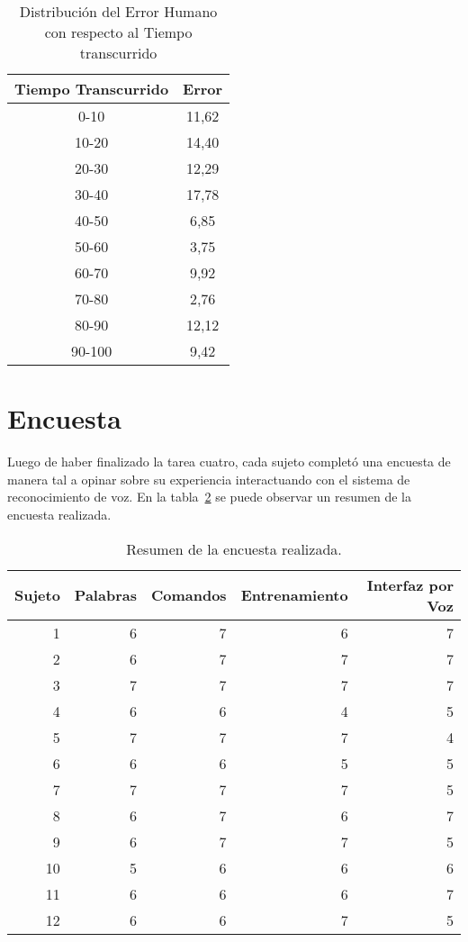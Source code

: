\begin{table}[H]
\centering
\footnotesize
\begin{tabular}{|c|c|}
\hline
    Tiempo Transcurrido & Error \\
    \hline
0-10  &  11,62 \\
10-20 &  14,40 \\
20-30 &  12,29 \\
30-40 &  17,78 \\
40-50 &  6,85 \\
50-60 &  3,75 \\
60-70 &  9,92 \\
70-80 &  2,76 \\
80-90 &  12,12 \\
90-100 & 9,42 \\
    \hline
\end{tabular}
\caption{Distribuci\'on del Error Humano con respecto al Tiempo transcurrido}
\label{sec:error-tiempo}
\end{table}

\section{Encuesta}

Luego de haber finalizado la tarea cuatro, cada sujeto complet\'o una encuesta de manera tal a
opinar sobre su experiencia interactuando con el sistema de reconocimiento de voz. 
En la tabla~\ref{sec:tabla-encuesta} se puede observar un resumen de la encuesta realizada.


\begin{table}[H] 
\centering
\footnotesize
\begin{tabular}{|r|r|r|r|r|}
\hline
    Sujeto & Palabras & Comandos & Entrenamiento & Interfaz por Voz \\
    \hline
    1 & 6 & 7 & 6 & 7 \\
    2 & 6 & 7 & 7 & 7 \\
    3 & 7 & 7 & 7 & 7 \\
    4 & 6 & 6 & 4 & 5 \\
    5 & 7 & 7 & 7 & 4 \\
    6 & 6 & 6 & 5 & 5 \\
    7 & 7 & 7 & 7 & 5 \\
    8 & 6 & 7 & 6 & 7  \\
    9 & 6 & 7 & 7 & 5  \\
    10 & 5 & 6 & 6 & 6  \\
    11 & 6 & 6 & 6 & 7  \\
    12 & 6 & 6 & 7 & 5  \\
\hline
\end{tabular}
\caption{Resumen de la encuesta realizada.}
\label{sec:tabla-encuesta}
\end{table}

